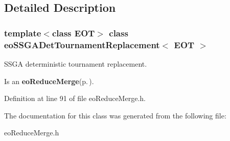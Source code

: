 \subsection{Detailed Description}
\subsubsection*{template$<$class EOT$>$ class eo\-SSGADet\-Tournament\-Replacement$<$ EOT $>$}

SSGA deterministic tournament replacement. 

Is an {\bf eo\-Reduce\-Merge}{\rm (p.\,\pageref{classeo_reduce_merge})}. 



Definition at line 91 of file eo\-Reduce\-Merge.h.

The documentation for this class was generated from the following file:\begin{CompactItemize}
\item 
eo\-Reduce\-Merge.h\end{CompactItemize}

